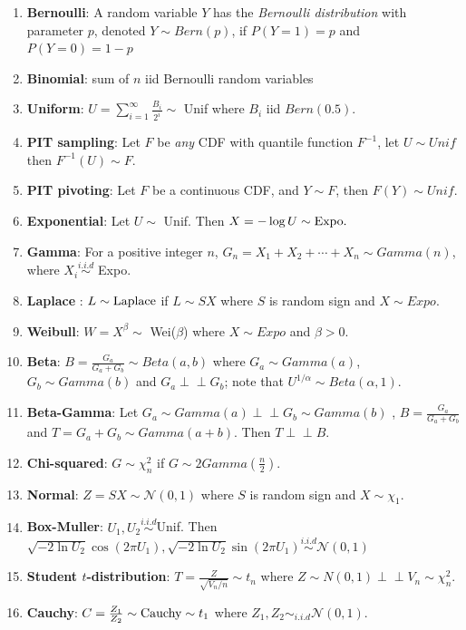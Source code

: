 \documentclass[
  letterpaper,
  DIV=11,
  numbers=noendperiod]{scrreprt}
\theoremstyle{definition}
\theoremstyle{plain}
\theoremstyle{remark}
\begin{document}
\begin{enumerate}
\def\labelenumi{\arabic{enumi}.}
\item
  \textbf{Bernoulli}: A random variable \(Y\) has the \emph{Bernoulli
  distribution} with parameter \(p\), denoted \(Y\sim Bern(p)\), if
  \(P(Y=1)=p\) and \(P(Y=0)=1-p\)
\item
  \textbf{Binomial}: sum of \(n\) iid Bernoulli random variables
\item
  \textbf{Uniform}: \(U = \sum_{i=1}^\infty \frac{B_i}{2^i} \sim\) Unif
  where \(B_i\) iid \(Bern(0.5)\).
\item
  \textbf{PIT sampling}: Let \(F\) be \textit{any} CDF with quantile
  function \(F^{-1}\), let \(U \sim Unif\) then \(F^{-1}(U) \sim F.\)
\item
  \textbf{PIT pivoting}: Let \(F\) be a continuous CDF, and
  \(Y \sim F\), then \(F(Y)\sim Unif.\)
\item
  \textbf{Exponential}: Let \(U\sim\) Unif. Then
  \(X = -\log U \sim \textnormal{Expo}.\)
\item
  \textbf{Gamma}: For a positive integer \(n\),
  \(G_n= X_1+X_2+\cdots + X_n \sim Gamma(n)\), where
  \(X_i \overset{i.i.d}{\sim}\) Expo.
\item
  \textbf{Laplace} : \(L \sim \textnormal{Laplace}\) if \(L \sim SX\)
  where \(S\) is random sign and \(X\sim Expo.\)
\item
  \textbf{Weibull}: \(W = X^\beta \sim\) Wei(\(\beta\)) where
  \(X \sim Expo\) and \(\beta >0.\)
\item
  \textbf{Beta}: \(B = \frac{G_a}{G_a+G_b} \sim Beta(a,b)\) where
  \(G_a \sim Gamma(a)\), \(G_b\sim Gamma(b)\) and
  \(G_a \perp\!\!\!\!\perp G_b\); note that
  \(U^{1/\alpha} \sim Beta(\alpha,1).\)
\item
  \textbf{Beta-Gamma}: Let
  \(G_a \sim Gamma(a) \perp\!\!\!\!\perp G_b\sim Gamma(b)\) ,
  \(B = \frac{G_a}{G_a+G_b}\) and \(T = G_a + G_b \sim Gamma(a+b).\)
  Then \(T \perp\!\!\!\!\perp B.\)
\item
  \textbf{Chi-squared}: \(G \sim \chi_n^2\) if
  \(G\sim 2Gamma\left(\frac{n}{2}\right).\)
\item
  \textbf{Normal}: \(Z = SX \sim \mathcal{N}(0,1)\) where \(S\) is
  random sign and \(X\sim \chi_1.\)
\item
  \textbf{Box-Muller}: \(U_1,U_2 \overset{i.i.d}{\sim}\)Unif. Then
  \(\sqrt{-2\ln U_2}\cos{(2\pi U_1)}, \sqrt{-2\ln U_2}\sin{(2\pi U_1)} \overset{i.i.d}{\sim} \mathcal{N}(0,1)\)
\item
  \textbf{Student \(t\)-distribution}:
  \(T = \frac{Z}{\sqrt{V_n/n}} \sim t_n\) where
  \(Z \sim N(0,1) \perp\!\!\!\!\perp V_n \sim \chi_n^2.\)
\item
  \textbf{Cauchy}:
  \(C = \frac{Z_1}{Z_2} \sim \textnormal{Cauchy} \sim t_1\) where
  \(Z_1,Z_2 \sim_{i.i.d} \mathcal{N}(0,1)\).
\end{enumerate}
\end{document}

